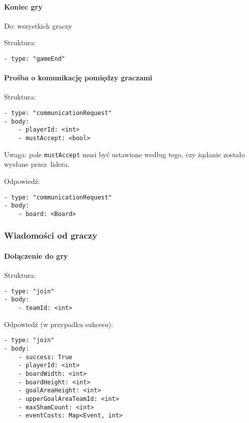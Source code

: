 \documentclass[a4paper]{article}
\newcommand{\code}{\texttt}
\begin{document}
\paragraph{Koniec gry}
\hfill

Do: wszystkich graczy

Struktura:

\begin{verbatim}
- type: "gameEnd"
\end{verbatim}

\paragraph{Prośba o komunikację pomiędzy graczami}
\hfill

Struktura:

\begin{verbatim}
- type: "communicationRequest"
- body:
    - playerId: <int>
    - mustAccept: <bool>
\end{verbatim}

Uwaga: pole \code{mustAccept} musi być ustawione według tego, czy żądanie zostało wysłane przez~lidera.

Odpowiedź:

\begin{verbatim}
- type: "communicationRequest"
- body:
    - board: <Board>
\end{verbatim}

\subsubsection{Wiadomości od graczy}

\paragraph{Dołączenie do gry}
\hfill

Struktura:

\begin{verbatim}
- type: "join"
- body:
    - teamId: <int>
\end{verbatim}

Odpowiedź (w przypadku sukcesu):

\begin{verbatim}
- type: "join"
- body:
    - success: True
    - playerId: <int>
    - boardWidth: <int>
    - boardHeight: <int>
    - goalAreaHeight: <int>
    - upperGoalAreaTeamId: <int>
    - maxShamCount: <int>
    - eventCosts: Map<Event, int>
\end{verbatim}
\end{document}
